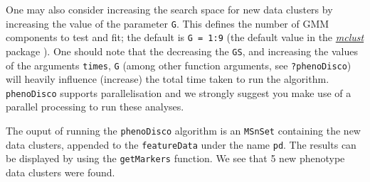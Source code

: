 One may also consider increasing the search space for new data
clusters by increasing the value of the parameter \texttt{G}. This
defines the number of GMM components to test and fit; the default is
\texttt{G = 1:9} (the default value in the
\href{https://cran.r-project.org/web/packages/mclust/index.html}{\textit{mclust}}
package \cite{mclust}). One should note that the decreasing the
\texttt{GS}, and increasing the values of the arguments
\texttt{times}, \texttt{G} (among other function arguments, see
\texttt{?phenoDisco}) will heavily influence (increase) the total time
taken to run the algorithm.  \texttt{phenoDisco} supports
parallelisation and we strongly suggest you make use of a parallel
processing to run these analyses.



The ouput of running the \texttt{phenoDisco} algorithm is an
\texttt{MSnSet} containing the new data clusters, appended to the
\texttt{featureData} under the name \texttt{pd}. The results can be
displayed by using the \texttt{getMarkers} function. We see that 5 new
phenotype data clusters were found.

